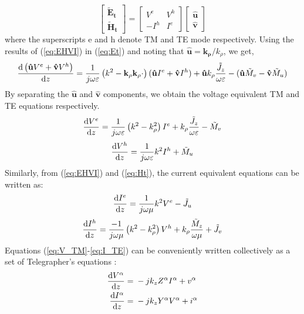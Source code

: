 \documentclass[11pt]{article}
\renewcommand{\v}[1]{\mathbf{#1}} %
\newcommand{\ti}[1]{\tilde{#1}} %
\renewcommand{\O}{\omega}  %
\newcommand{\E}{\varepsilon}  %
\renewcommand{\u}{\mu}  %
\newcommand{\p}{\rho}  %
\renewcommand{\^}{\hat}  %
\begin{document}
  \begin{equation}
    \left[\begin{array}{c}
    \v{\ti{E}_t} \\
    \v{\ti{H}_t}
    \end{array} \right]
    = \left[ \begin{array}{cc}
    V^e & V^h \\
    -I^h & I^e
    \end{array} \right]
    \left[\begin{array}{c}
    \v{\^u} \\
    \v{\^v}
    \end{array} \right]
    \label{eq:EHVI}
  \end{equation}
  where the superscripts e and h denote TM and TE mode respectively.
  Using the results of (\ref{eq:EHVI}) in (\ref{eq:Et}) and noting that $\v{\^u} = \v{k_{\p}}/k_{\p}$, we get,
  \begin{equation}
    \dv{\left(\v{\^u}V^e + \v{\^v}V^h \right)}{z} = \frac{1}{j \O \E}\left( k^2 - \v{k_{\p}}\v{k_{\p}} \cdot \right) (\v{\^u} I^e + \v{\^v}I^h) + \v{\^u}k_{\p} \frac{\ti{J}_z}{\O \E} - (\v{\^u} \ti{M}_v - \v{\^v} \ti{M}_u)
    \label{eq:Vinuv}
  \end{equation}
  By separating the $\v{\^u}$ and $\v{\^v}$ components, we obtain the voltage equivalent TM and TE equations respectively.
  \begin{equation}
    \dv{V^e}{z} = \frac{1}{j \O \E}\left( k^2 - k_{\p}^2 \right)I^e + k_{\p}\frac{\ti{J}_z}{\O \E} - \ti{M}_v
    \label{eq:V_TM}
  \end{equation}
  \begin{equation}
    \dv{V^h}{z} = \frac{1}{j \O \E}k^2 I^h + \ti{M}_u
    \label{eq:V_TE}
  \end{equation}
  Similarly, from (\ref{eq:EHVI}) and (\ref{eq:Ht}), the current equivalent equations can be written as:
  \begin{equation}
    \dv{I^e}{z} = \frac{1}{j \O \u}k^2 V^e - \ti{J}_u
    \label{eq:I_TM}
  \end{equation}
  \begin{equation}
    \dv{I^h}{z} = \frac{-1}{j \O \u}\left( k^2 - k_{\p}^2 \right)V^h + k_{\p}\frac{\ti{M}_z}{\O \u} + \ti{J}_v
    \label{eq:I_TE}
  \end{equation}
  Equations (\ref{eq:V_TM}-\ref{eq:I_TE}) can be conveniently written collectively as a set of Telegrapher's equations \cite[p. 1166]{michalski2005electromagnetic}:
  \begin{subequations}
    \begin{align}
      \dv{V^{\alpha}}{z} ={}& -j k_z Z^{\alpha}I^{\alpha} + v^{\alpha}
      \label{eq:TL_V}\\
      \dv{I^{\alpha}}{z} ={}& -j k_z Y^{\alpha}V^{\alpha} + i^{\alpha}
      \label{eq:TL_I}
    \end{align}
    \label{eq:TLE}
  \end{subequations}
\end{document}
